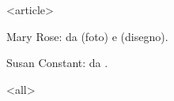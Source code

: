 
\mode
<article>

Mary     Rose:    da     \cite[p.     97]{marsden2003}    (foto)     e
\cite[p. 93]{marsden2003} (disegno).

Susan Constant: da \cite[p. 88]{lavery2005}.

\mode
<all>


